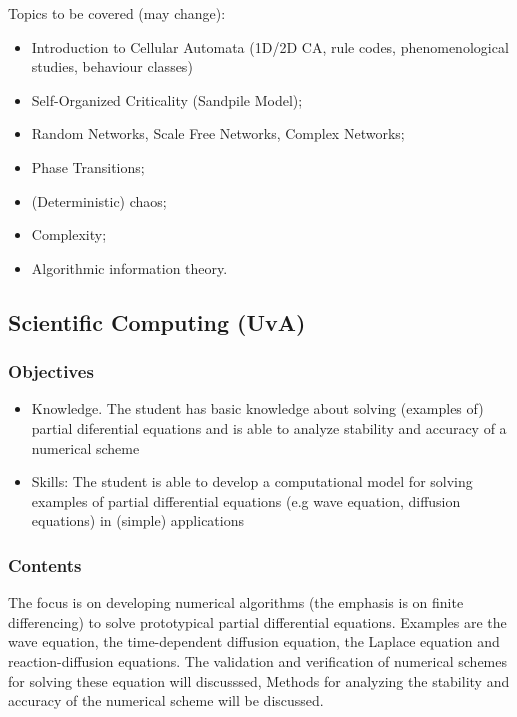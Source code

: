 \documentclass[11pt]{article}
\begin{document}
Topics to be covered (may change):

\begin{itemize}
\item Introduction to Cellular Automata (1D/2D CA, rule codes, phenomenological
studies, behaviour classes)
\item Self-Organized Criticality (Sandpile Model);
\item Random Networks, Scale Free Networks, Complex Networks;
\item Phase Transitions;
\item (Deterministic) chaos;
\item Complexity;
\item Algorithmic information theory.
\end{itemize}

\subsection{Scientific Computing (UvA)}
\label{sec:org52efab9}

\subsubsection{Objectives}
\label{sec:org1463fde}

\begin{itemize}
\item Knowledge. The student has basic knowledge about solving (examples of) partial
diferential equations and is able to analyze stability and accuracy of a
numerical scheme
\item Skills: The student is able to develop a computational model for solving
examples of partial differential equations (e.g wave equation, diffusion
equations) in (simple) applications
\end{itemize}

\subsubsection{Contents}
\label{sec:org93985fa}

The focus is on developing numerical algorithms (the emphasis is on finite
differencing) to solve prototypical partial differential equations. Examples are
the wave equation, the time-dependent diffusion equation, the Laplace equation
and reaction-diffusion equations. The validation and verification of numerical
schemes for solving these equation will discusssed, Methods for analyzing the
stability and accuracy of the numerical scheme will be discussed.
\end{document}
